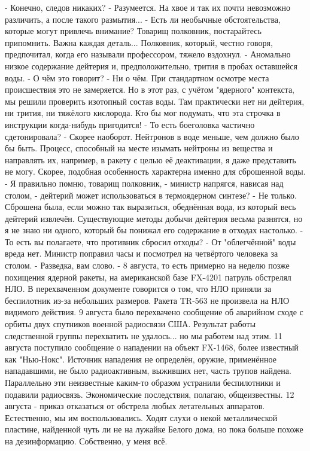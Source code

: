  - Конечно, следов никаких?
 - Разумеется. На хвое и так их почти невозможно различить, а после такого размытия...
 - Есть ли необычные обстоятельства, которые могут привлечь внимание? Товарищ полковник, постарайтесь припомнить. Важна каждая деталь...
Полковник, который, честно говоря, предпочитал, когда его называли профессором, тяжело вздохнул.
 - Аномально низкое содержание дейтерия и, предположительно, трития в пробах оставшейся воды.
 - О чём это говорит?
 - Ни о чём. При стандартном осмотре места происшествия это не замеряется. Но в этот раз, с учётом "ядерного" контекста, мы решили проверить изотопный состав воды. Там практически нет ни дейтерия, ни трития, ни тяжёлого кислорода.
Кто бы мог подумать, что эта строчка в инструкции когда-нибудь пригодится!
 - То есть боеголовка частично сдетонировала?
 - Скорее наоборот. Нейтронов в воде меньше, чем должно было бы быть. Процесс, способный на месте изымать нейтроны из вещества и направлять их, например, в ракету с целью её деактивации, я даже представить не могу. Скорее, подобная особенность характерна именно для сброшенной воды.
 - Я правильно помню, товарищ полковник, - министр напрягся, нависая над столом, - дейтерий может использоваться в термоядерном синтезе?
 - Не только. Сброшена была, если можно так выразиться, обеднённая вода, из который весь дейтерий извлечён. Существующие методы добычи дейтерия весьма разнятся, но я не знаю ни одного, который бы понижал его содержание в отходах настолько.
 - То есть вы полагаете, что противник сбросил отходы?
 - От "облегчённой" воды вреда нет.
Министр поправил часы и посмотрел на четвёртого человека за столом.
 - Разведка, вам слово.
 - 8 августа, то есть примерно на неделю позже похищения ядерной ракеты, на американской базе FX-4201 патруль обстрелял НЛО. В перехваченном документе говорится о том, что НЛО приняли за беспилотник из-за небольших размеров. Ракета TR-563 не произвела на НЛО видимого действия.
9 августа было перехвачено сообщение об аварийном сходе с орбиты двух спутников военной радиосвязи США. Результат работы следственной группы перехватить не удалось... но мы работем над этим.
11 августа поступило сообщение о нападении на объект FX-1468, более известный как "Нью-Нокс". Источник нападения не определён, оружие, применённое нападавшими, не было радиоактивным, выживших нет, часть трупов найдена. Параллельно эти неизвестные каким-то образом устранили беспилотники и подавили радиосвязь. Экономические последствия, полагаю, общеизвестны.
12 августа - приказ отказаться от обстрела любых летательных аппаратов. Естественно, мы им воспользовались.
Ходят слухи о некой металлической пластине, найденной чуть ли не на лужайке Белого дома, но пока больше похоже на дезинформацию.
Собственно, у меня всё.

